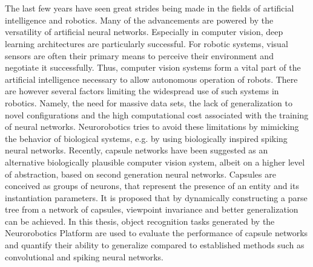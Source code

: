 \chapter{\abstractname}
The last few years have seen great strides being made in the fields of artificial intelligence and robotics. Many of the advancements are powered by the versatility of artificial neural networks. Especially in computer vision, deep learning architectures are particularly successful. For robotic systems, visual sensors are often their primary means to perceive their environment and negotiate it successfully. Thus, computer vision systems form a vital part of the artificial intelligence necessary to allow autonomous operation of robots. There are however several factors limiting the widespread use of such systems in robotics. Namely, the need for massive data sets, the lack of generalization to novel configurations and the high computational cost associated with the training of neural networks. Neurorobotics tries to avoid these limitations by mimicking the behavior of biological systems, e.g. by using biologically inspired spiking neural networks. Recently, capsule networks have been suggested as an alternative biologically plausible computer vision system, albeit on a higher level of abstraction, based on second generation neural networks. Capsules are conceived as groups of neurons, that represent the presence of an entity and its instantiation parameters. It is proposed that by dynamically constructing a parse tree from a network of capsules, viewpoint invariance and better generalization can be achieved. In this thesis, object recognition tasks generated by the Neurorobotics Platform are used to evaluate the performance of capsule networks and quantify their ability to generalize compared to established methods such as convolutional and spiking neural networks.